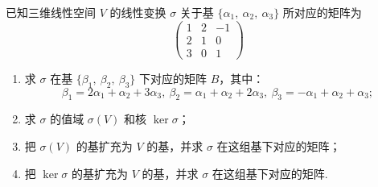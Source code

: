 \begin{example}
    已知三维线性空间 $V$ 的线性变换 $\sigma$ 关于基 $\{\alpha_1,\ \alpha_2,\ \alpha_3\}$ 所对应的矩阵为
	\[\begin{pmatrix}1 & 2 & -1 \\ 2 & 1 & 0 \\ 3 & 0 & 1\end{pmatrix}\]
	\begin{enumerate}[label=(\arabic*)]
        \item 求 $\sigma$ 在基 $\{\beta_1,\ \beta_2,\ \beta_3\}$ 下对应的矩阵 $B$，其中：
		\[\beta_1=2\alpha_1+\alpha_2+3\alpha_3,\ \beta_2=\alpha_1+\alpha_2+2\alpha_3,\ \beta_3=-\alpha_1+\alpha_2+\alpha_3;\]
        \item 求 $\sigma$ 的值域 $\sigma(V)$ 和核 $\ker\sigma$；
        \item 把 $\sigma(V)$ 的基扩充为 $V$ 的基，并求 $\sigma$ 在这组基下对应的矩阵；
        \item 把 $\ker\sigma$ 的基扩充为 $V$ 的基，并求 $\sigma$ 在这组基下对应的矩阵.
    \end{enumerate}
\end{example}
\begin{solution}

\end{solution}

